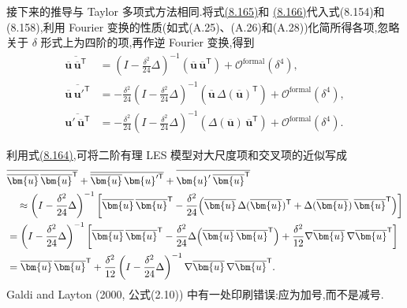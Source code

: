 \begin{note}[步骤 4 和 5:有理函数近似]
\label{note:les-rational-model-derivation}
接下来的推导与 Taylor 多项式方法相同.将式\hyperref[eq:les-rational-filter-expansion]{(8.165)}和
\hyperref[eq:les-rational-inverse-filter-expansion]{(8.166)}代入式(8.154)和(8.158),利用 Fourier 变换的性质(如式(A.25)、(A.26)和(A.28))化简所得各项,忽略关于 $\delta$ 形式上为四阶的项,再作逆 Fourier 变换,得到
\begin{equation}\label{eq:les-rational-large-cross-terms}
\begin{aligned}
 \overline{\overline{\bm{u}}\,
  \overline{\bm{u}}^{\mathsf T}}
 &=\left(I-\frac{\delta^2}{24}\Delta\right)^{-1}
   \left(
    \overline{\bm{u}}\,
    \overline{\bm{u}}^{\mathsf T}\right)
   +\mathcal{O}^{\mathrm{formal}}(\delta^4),\\
 \overline{\overline{\bm{u}}\,\bm{u}'^{\mathsf T}}
 &=-\frac{\delta^2}{24}
   \left(I-\frac{\delta^2}{24}\Delta\right)^{-1}
   \left(
    \overline{\bm{u}}\,
    \Delta(\overline{\bm{u}})^{\mathsf T}\right)
   +\mathcal{O}^{\mathrm{formal}}(\delta^4),\\
 \overline{\bm{u}'\,\overline{\bm{u}}^{\mathsf T}}
 &=-\frac{\delta^2}{24}
   \left(I-\frac{\delta^2}{24}\Delta\right)^{-1}
   \left(
    \Delta(\overline{\bm{u}})\,
    \overline{\bm{u}}^{\mathsf T}\right)
   +\mathcal{O}^{\mathrm{formal}}(\delta^4).
\end{aligned}
\end{equation}
\end{note}

\begin{note}
\label{note:les-rational-model}
利用式\hyperref[eq:taylor-les-product-identity]{(8.164)},可将二阶有理 LES 模型对大尺度项和交叉项的近似写成
\begin{equation}\label{eq:rational-les-large-cross-model}
\begin{aligned}
 &\overline{\overline{\bm{u}}\,
  \overline{\bm{u}}^{\mathsf T}}
 +\overline{\overline{\bm{u}}\,\bm{u}'^{\mathsf T}}
 +\overline{\bm{u}'\,\overline{\bm{u}}^{\mathsf T}}\\
 &\quad\approx
 \left(I-\frac{\delta^2}{24}\Delta\right)^{-1}
 \left[
  \overline{\bm{u}}\,
  \overline{\bm{u}}^{\mathsf T}
  -\frac{\delta^2}{24}\Bigl(
   \overline{\bm{u}}\,
   \Delta(\overline{\bm{u}})^{\mathsf T}
   +\Delta(\overline{\bm{u}})\,
   \overline{\bm{u}}^{\mathsf T}\Bigr)
 \right]\\
 &=\left(I-\frac{\delta^2}{24}\Delta\right)^{-1}
 \left[
  \overline{\bm{u}}\,
  \overline{\bm{u}}^{\mathsf T}
  -\frac{\delta^2}{24}\Delta\!
   \left(\overline{\bm{u}}\,
   \overline{\bm{u}}^{\mathsf T}\right)
  +\frac{\delta^2}{12}
   \nabla\overline{\bm{u}}\,
   \nabla\overline{\bm{u}}^{\mathsf T}
 \right]\\
 &=\overline{\bm{u}}\,
   \overline{\bm{u}}^{\mathsf T}
  +\frac{\delta^2}{12}
   \left(I-\frac{\delta^2}{24}\Delta\right)^{-1}
   \nabla\overline{\bm{u}}\,
   \nabla\overline{\bm{u}}^{\mathsf T}.
\end{aligned}
\end{equation}
Galdi and Layton (2000, 公式(2.10)) 中有一处印刷错误:应为加号,而不是减号.
\end{note}

